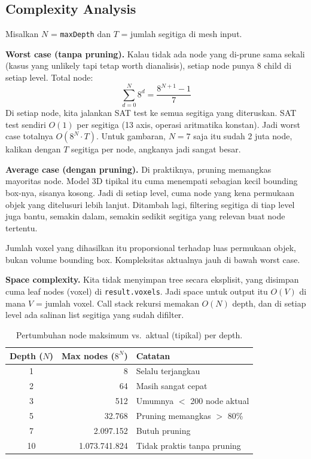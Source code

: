 \documentclass[11pt,a4paper]{article}
\begin{document}
\subsection{Complexity Analysis}

Misalkan $N$ = \texttt{maxDepth} dan $T$ = jumlah segitiga di mesh input.

\textbf{Worst case (tanpa pruning).}
Kalau tidak ada node yang di-prune sama sekali (kasus yang unlikely tapi tetap worth dianalisis),
setiap node punya 8 child di setiap level. Total node:
\[
\sum_{d=0}^{N} 8^d = \frac{8^{N+1} - 1}{7}
\]
Di setiap node, kita jalankan SAT test ke semua segitiga yang diteruskan. SAT test sendiri
$O(1)$ per segitiga (13 axis, operasi aritmatika konstan). Jadi worst case totalnya
$O(8^N \cdot T)$. Untuk gambaran, $N = 7$ saja itu sudah 2 juta node, kalikan dengan $T$
segitiga per node, angkanya jadi sangat besar.

\textbf{Average case (dengan pruning).}
Di praktiknya, pruning memangkas mayoritas node. Model 3D tipikal itu cuma menempati
sebagian kecil bounding box-nya, sisanya kosong. Jadi di setiap level, cuma node yang
kena permukaan objek yang ditelusuri lebih lanjut. Ditambah lagi, filtering segitiga di
tiap level juga bantu, semakin dalam, semakin sedikit segitiga yang relevan buat node
tertentu.

Jumlah voxel yang dihasilkan itu proporsional terhadap luas permukaan
objek, bukan volume bounding box. Kompleksitas aktualnya jauh di bawah worst case.

\textbf{Space complexity.}
Kita tidak menyimpan tree secara eksplisit, yang disimpan cuma leaf nodes (voxel) di
\texttt{result.voxels}. Jadi space untuk output itu $O(V)$ di mana $V$ = jumlah voxel.
Call stack rekursi memakan $O(N)$ depth, dan di setiap level ada salinan list segitiga
yang sudah difilter.

\begin{table}[H]
\centering
\caption{Pertumbuhan node maksimum vs.\ aktual (tipikal) per depth.}
\label{tab:growth}
\begin{tabular}{@{}crl@{}}
\toprule
\textbf{Depth ($N$)} & \textbf{Max nodes ($8^N$)} & \textbf{Catatan} \\
\midrule
1 & 8 & Selalu terjangkau \\
2 & 64 & Masih sangat cepat \\
3 & 512 & Umumnya $<$ 200 node aktual \\
5 & 32.768 & Pruning memangkas $>$ 80\% \\
7 & 2.097.152 & Butuh pruning \\
10 & 1.073.741.824 & Tidak praktis tanpa pruning \\
\bottomrule
\end{tabular}
\end{table}
\end{document}
